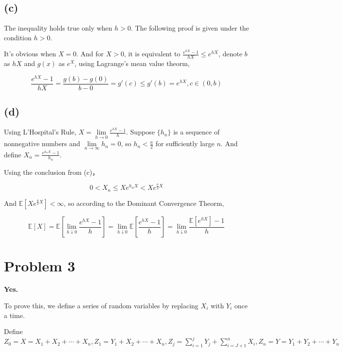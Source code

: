 \documentclass{article}
\begin{document}
\subsection{(c)}

The inequality holds true only when $h>0$. The following proof is given under the condition $h>0$.

It's obvious when $X=0$. And for $X>0$, it is equivalent to $\frac {e^{hX}-1}{hX} \leqslant e^{hX}$, denote $b$ as $hX$ and $g(x)$ as $e^X$, using Lagrange's mean value theorm,

\begin{equation}
    \frac{e^{hX}-1}{hX} = \frac{g(b)-g(0)}{b-0} = g'(c) \leqslant g'(b) = e^{hX}, c \in (0,b)
\end{equation}

\subsection{(d)}

Using L'Hospital's Rule, $X = \lim\limits_{h\to 0} \frac{e^{hX}-1}{h}$. 
Suppose $\{h_n\}$ is a sequence of nonnegative numbers and $\lim\limits_{n\to \infty} h_n = 0$, so $h_n<\frac{a}{2}$ for sufficiently large $n$. And define $X_n = \frac {e^{h_n X}-1}{h_n}$.

Using the conclusion from (c)，

\begin{equation}
    0<X_n\leqslant  Xe^{h_nX} < Xe^{\frac{a}{2}X}
\end{equation}  

And $\mathbb{E}[Xe^{\frac{a}{2}X}] < \infty$, so according to the Dominant Convergence Theorm,

\begin{equation}
    \mathbb{E}[X] = \mathbb{E}[\lim_{h\downarrow 0 } \frac{e^{hX}-1}{h}] = \lim_{h\downarrow 0 } \mathbb{E}[ \frac{e^{hX}-1}{h}] = \lim_{h\downarrow 0 } \frac{\mathbb{E}[e^{hX}]-1}{h}
\end{equation}

\section{Problem 3}

\textbf{Yes.}

To prove this, we define a series of random variables by replacing $X_i$ with $Y_i$ once a time. 

Define $Z_0 =X =  X_1+X_2+\cdots+X_n, Z_1 = Y_1 + X_2 + \cdots +X_n, Z_j= \sum_{i=1}^{j} Y_j + \sum_{i=J+1}^{n} X_i, Z_n = Y = Y_1+ Y_2 +\cdots+Y_n$
\end{document}
